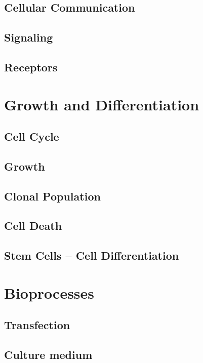 \documentclass[12pt]{cheatsheet}
\begin{document}
\subsection*{Cellular Communication}

\subsection*{Signaling}

\subsection*{Receptors}

\vfill \null \columnbreak


\section*{Growth and Differentiation}
\subsection*{Cell Cycle}

\subsection*{Growth}

\subsection*{Clonal Population}

\subsection*{Cell Death}

\subsection*{Stem Cells – Cell Differentiation}


\section*{Bioprocesses}

\subsection*{Transfection}

\subsection*{Culture medium}

\end{document}
